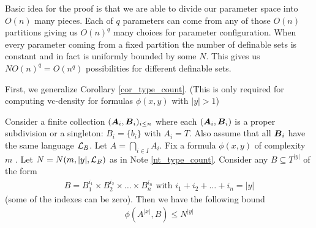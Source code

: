 \documentclass{amsart}
\DeclareMathOperator{\A}{\boldface A}
\DeclareMathOperator{\B}{\boldface B}
\begin{document}
Basic idea for the proof is that we are able to divide our parameter space into $O(n)$ many pieces. Each of $q$ parameters can come from any of those $O(n)$ partitions giving us $O(n)^q$ many choices for parameter configuration. When every parameter coming from a fixed partition the number of definable sets is constant and in fact is uniformly bounded by some $N$. This gives us $N O(n)^q = O(n^q)$ possibilities for different definable sets.

First, we generalize Corollary \ref{cor_type_count}. (This is only required for computing vc-density for formulas $\phi(x, y)$ with $|y| > 1$)

\begin{Lemma} \label{lm_partition_bound}
	Consider a finite collection $(\A_i, \B_i)_{i \leq n}$ where each $(\A_i, \B_i)$ is a proper subdivision or a singleton: $B_i = \{b_i\}$ with $A_i = T$. Also assume that all $\B_i$ have the same language $\mathcal L_B$. Let $A = \bigcap_{i \in I} A_i$. Fix a formula $\phi(x, y)$ of complexity $m$ . Let $N = N(m, |y|, \mathcal L_B)$ as in Note \ref{nt_type_count}. Consider any $B \subseteq T^{|y|}$ of the form
	\begin{align*}
		B = B_1^{i_1} \times B_2^{i_2} \times \ldots \times B_n^{i_n} \text { with } i_1 + i_2 + \ldots + i_n = |y|
	\end{align*}
	(some of the indexes can be zero). Then we have the following bound
	\begin{align*}
		\phi(A^{|x|}, B) \leq N^{|y|}
	\end{align*}
\end{Lemma}
\end{document}
